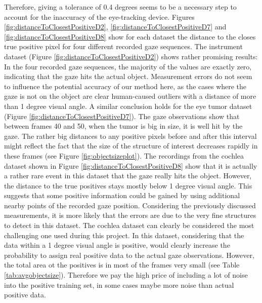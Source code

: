Therefore, giving a tolerance of 0.4 degrees seems to be a necessary step to account for the inaccuracy of the eye-tracking device. 
Figures \ref{fig:distanceToClosestPositiveD2}, \ref{fig:distanceToClosestPositiveD7} and \ref{fig:distanceToClosestPositiveD8} show for each dataset the distance to the closes true positive pixel for four different recorded gaze sequences. 
The instrument dataset (Figure \ref{fig:distanceToClosestPositiveD2}) shows rather promising results: 
In the four recorded gaze sequences, the majority of the values are exactly zero, indicating that the gaze hits the actual object. 
Measurement errors do not seem to influence the potential accuracy of our method here, as the cases where the gaze is not on the object are clear human-caused outliers with a distance of more than 1 degree visual angle.
A similar conclusion holds for the eye tumor dataset (Figure \ref{fig:distanceToClosestPositiveD7}). 
The gaze observations show that between frames 40 and 50, when the tumor is big in size, it is well hit by the gaze. 
The rather big distances to any positive pixels before and after this interval might reflect the fact that the size of the structure of interest decreases rapidly in these frames (see Figure \ref{fig:objectsizeplot}). 
The recordings from the cochlea dataset shown in Figure \ref{fig:distanceToClosestPositiveD8} show that it is actually a rather rare event in this dataset that the gaze really hits the object. However, the distance to the true positives stays mostly below 1 degree visual angle. This suggests that some positive information could be gained by using additional nearby points of the recorded gaze position.
Considering the previously discussed measurements, it is more likely that the errors are due to the very fine structures to detect in this dataset.
The cochlea dataset can clearly be considered the most challenging one used during this project.
In this dataset, considering that the data within a 1 degree visual angle is positive, would clearly increase the probability to assign real positive data to the actual gaze observations. 
However, the total area ot the positives is in most of the frames very small (see Table \ref{tab:avgobjectsize}). 
Therefore we pay the high price of including a lot of noise into the positive training set, in some cases maybe more noise than actual positive data.


